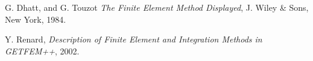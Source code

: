 \documentclass[11pt,a4paper]{article}
\begin{document}
\begin{thebibliography}{99}
% 
% 
% 
  G. {\sc Dhatt, and  G. Touzot}
  {\it The Finite Element Method Displayed}, 
 J. Wiley \& Sons,  New York, 1984.

  Y. {\sc Renard},
  {\it Description of Finite Element and Integration Methods in GETFEM++}, 2002.


\end{thebibliography}
\end{document}
